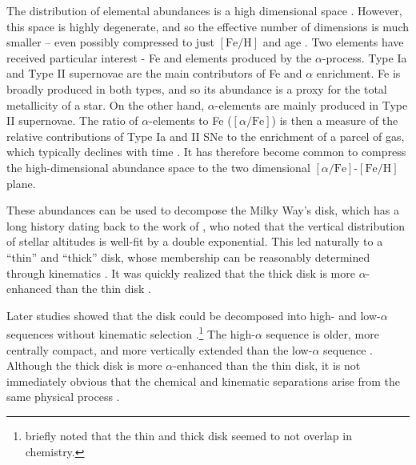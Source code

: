 \documentclass[twocolumn,linenumbers,trackchanges]{aastex631}
\newcommand{\FeH}{\ensuremath{[\textrm{Fe}/\textrm{H}]}}
\newcommand{\alphaFe}{\ensuremath{[\alpha/\textrm{Fe}]}}
\begin{document}
The distribution of elemental abundances is a high dimensional space \citep[e.g., 32 elements in][]{2024ApJ...961L..41J}. However, this space is highly degenerate, and so the effective number of dimensions is much smaller -- even possibly compressed to just \FeH{} and age \citep{2019ApJ...883..177N}. Two elements have received particular interest - Fe and elements produced by the $\alpha$-process. Type Ia and Type II supernovae are the main contributors of Fe and $\alpha$ enrichment. Fe is broadly produced in both types, and so its abundance is a proxy for the total metallicity of a star. On the other hand, $\alpha$-elements are mainly produced in Type II supernovae. The ratio of $\alpha$-elements to Fe (\alphaFe{}) is then a measure of the relative contributions of Type Ia and II SNe to the enrichment of a parcel of gas, which typically declines with time \citep{1979ApJ...229.1046T,1986A&A...154..279M}. It has therefore become common to compress the high-dimensional abundance space to the two dimensional \alphaFe{}-\FeH{} plane.

These abundances can be used to decompose the Milky Way's disk, which has a long history dating back to the work of \citet{1983MNRAS.202.1025G}, who noted that the vertical distribution of stellar altitudes is well-fit by a double exponential. This led naturally to a ``thin'' and ``thick'' disk, whose membership can be reasonably determined through kinematics \citep[e.g.][]{2003A&A...410..527B}. It was quickly realized that the thick disk is more $\alpha$-enhanced than the thin disk \citep{1996ASPC...92..307G,1998A&A...338..161F}.

Later studies showed that the disk could be decomposed into high- and low-$\alpha$ sequences without kinematic selection \citep{2011A&A...535L..11A,2012A&A...545A..32A}.\footnote{\citet{2003A&A...410..527B} briefly noted that the thin and thick disk seemed to not overlap in chemistry.} The high-$\alpha$ sequence is older, more centrally compact, and more vertically extended than the low-$\alpha$ sequence \citep{2013A&A...560A.109H,2024IAUS..377..115N}. Although the thick disk is more $\alpha$-enhanced than the thin disk, it is not immediately obvious that the chemical and kinematic separations arise from the same physical process \citep[or that they even exist, see][]{2012ApJ...751..131B}.
\end{document}
